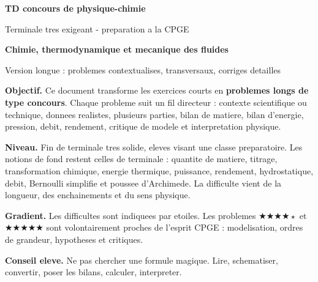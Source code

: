 \documentclass[11pt,a4paper]{article}
\newcommand{\difffour}{\(\bigstar\bigstar\bigstar\bigstar\star\)}
\newcommand{\difffive}{\(\bigstar\bigstar\bigstar\bigstar\bigstar\)}
\begin{document}

\begin{titlepage}
\centering
\vspace*{0.8cm}
{\Huge \bfseries TD concours de physique-chimie\par}
\vspace{0.25cm}
{\LARGE Terminale tres exigeant - preparation a la CPGE\par}
\vspace{0.55cm}
{\Large \bfseries Chimie, thermodynamique et mecanique des fluides\par}
\vspace{0.35cm}
{\large Version longue : problemes contextualises, transversaux, corriges detailles\par}

\vspace{0.8cm}

\begin{tcolorbox}[colback=blue!4,colframe=bleu,width=0.93\textwidth]
\textbf{Objectif.} Ce document transforme les exercices courts en \textbf{problemes longs de type concours}. Chaque probleme suit un fil directeur : contexte scientifique ou technique, donnees realistes, plusieurs parties, bilan de matiere, bilan d'energie, pression, debit, rendement, critique de modele et interpretation physique.

\medskip

\textbf{Niveau.} Fin de terminale tres solide, eleves visant une classe preparatoire. Les notions de fond restent celles de terminale : quantite de matiere, titrage, transformation chimique, energie thermique, puissance, rendement, hydrostatique, debit, Bernoulli simplifie et poussee d'Archimede. La difficulte vient de la longueur, des enchainements et du sens physique.

\medskip

\textbf{Gradient.} Les difficultes sont indiquees par etoiles. Les problemes \difffour{} et \difffive{} sont volontairement proches de l'esprit CPGE : modelisation, ordres de grandeur, hypotheses et critiques.
\end{tcolorbox}

\vfill
\textbf{Conseil eleve.} Ne pas chercher une formule magique. Lire, schematiser, convertir, poser les bilans, calculer, interpreter.
\end{titlepage}

\tableofcontents
\newpage
\end{document}
